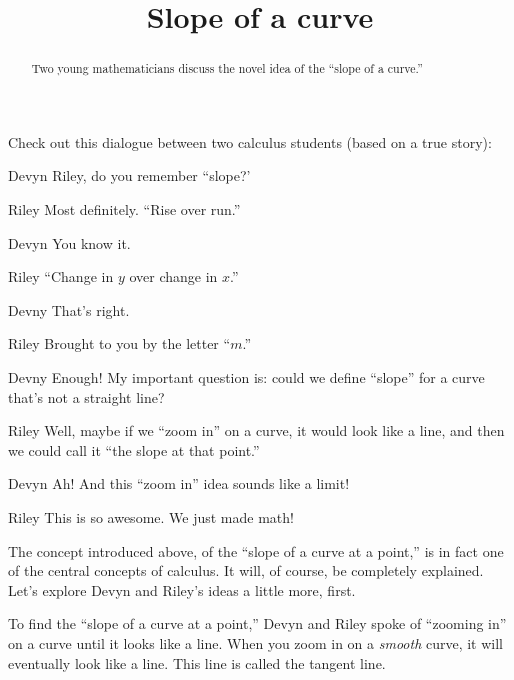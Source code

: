 \documentclass{ximera}
\title[Break-Ground:]{Slope of a curve}
\begin{document}
\begin{abstract}
Two young mathematicians discuss the novel idea of the ``slope of a curve.''
\end{abstract}
\maketitle


Check out this dialogue between two calculus students (based on a true
story):

\begin{dialogue}
\item[Devyn] Riley, do you remember ``slope?'
\item[Riley] Most definitely. ``Rise over run.''
\item[Devyn] You know it.
\item[Riley] ``Change in $y$ over change in $x$.''
\item[Devny] That's right.  
\item[Riley] Brought to you by the letter ``$m$.''
\item[Devny] Enough! My important question is: could we define
  ``slope'' for a curve that's not a straight line?
\item[Riley] Well, maybe if we ``zoom in'' on a curve, it would look
  like a line, and then we could call it ``the slope at that point.''
\item[Devyn] Ah! And this ``zoom in'' idea sounds like a limit!
\item[Riley] This is so awesome. We just made math!
\end{dialogue}

The concept introduced above, of the ``slope of a curve at a point,''
is in fact one of the central concepts of calculus. It will,
of course, be completely explained.  Let's explore Devyn
and Riley's ideas a little more, first.



To find the ``slope of a curve at a point,'' Devyn and Riley spoke of
``zooming in'' on a curve until it looks like a line. When you zoom in
on a \textit{smooth} curve, it will eventually look like a line. This
line is called the tangent line.

\end{document}
